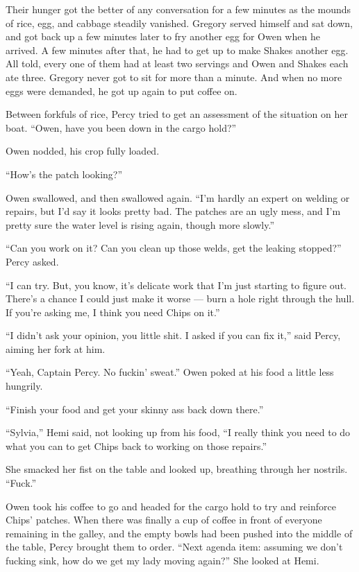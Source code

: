 \documentclass[
]{scrbook}
\begin{document}
Their hunger got the better of any conversation for a few minutes as the
mounds of rice, egg, and cabbage steadily vanished. Gregory served
himself and sat down, and got back up a few minutes later to fry another
egg for Owen when he arrived. A few minutes after that, he had to get up
to make Shakes another egg. All told, every one of them had at least two
servings and Owen and Shakes each ate three. Gregory never got to sit
for more than a minute. And when no more eggs were demanded, he got up
again to put coffee on.

Between forkfuls of rice, Percy tried to get an assessment of the
situation on her boat. ``Owen, have you been down in the cargo hold?''

Owen nodded, his crop fully loaded.

``How's the patch looking?''

Owen swallowed, and then swallowed again. ``I'm hardly an expert on
welding or repairs, but I'd say it looks pretty bad. The patches are an
ugly mess, and I'm pretty sure the water level is rising again, though
more slowly.''

``Can you work on it? Can you clean up those welds, get the leaking
stopped?'' Percy asked.

``I can try. But, you know, it's delicate work that I'm just starting to
figure out. There's a chance I could just make it worse --- burn a hole
right through the hull. If you're asking me, I think you need Chips on
it.''

``I didn't ask your opinion, you little shit. I asked if you can fix
it,'' said Percy, aiming her fork at him.

``Yeah, Captain Percy. No fuckin' sweat.'' Owen poked at his food a
little less hungrily.

``Finish your food and get your skinny ass back down there.''

``Sylvia,'' Hemi said, not looking up from his food, ``I really think
you need to do what you can to get Chips back to working on those
repairs.''

She smacked her fist on the table and looked up, breathing through her
nostrils. ``Fuck.''

\bigskip

Owen took his coffee to go and headed for the cargo hold to try and
reinforce Chips' patches. When there was finally a cup of coffee in
front of everyone remaining in the galley, and the empty bowls had been
pushed into the middle of the table, Percy brought them to order. ``Next
agenda item: assuming we don't fucking sink, how do we get my lady
moving again?'' She looked at Hemi.
\end{document}
